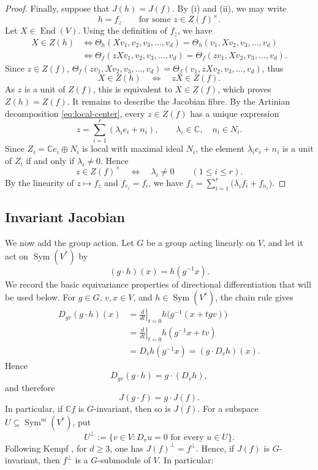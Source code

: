 \documentclass[11pt,reqno]{amsart}
\numberwithin{equation}{section}
\theoremstyle{definition}
\theoremstyle{remark}
\newcommand{\C}{\mathbb C}
\newcommand{\Sym}{\operatorname{Sym}}
\newcommand{\End}{\operatorname{End}}
\begin{document}
\begin{proof}
Finally, suppose that $J(h)=J(f)$.  By (i) and (ii), we may write
\[
  h=f_z
  \qquad\text{for some }z\in Z(f)^\times.
\]
Let $X\in\End(V)$.  Using the definition of $f_z$, we have
\[
\begin{aligned}
  X\in Z(h)
  &\Longleftrightarrow
  \Theta_h(Xv_1,v_2,v_3,\ldots,v_d)
  =
  \Theta_h(v_1,Xv_2,v_3,\ldots,v_d)
  \\
  &\Longleftrightarrow
  \Theta_f(zXv_1,v_2,v_3,\ldots,v_d)
  =
  \Theta_f(zv_1,Xv_2,v_3,\ldots,v_d).
\end{aligned}
\]
Since $z\in Z(f)$, $\Theta_f(zv_1,Xv_2,v_3,\ldots,v_d)
  =
  \Theta_f(v_1,zXv_2,v_3,\ldots,v_d)$, thus
  \[X\in Z(h)
  \quad\Longleftrightarrow\quad
  zX\in Z(f).
\]
As $z$ is a unit of $Z(f)$, this is equivalent to $X\in Z(f)$, which proves $Z(h)=Z(f)$. It remains to describe the Jacobian fibre.  By the Artinian decomposition
\eqref{eq:local-center}, every $z\in Z(f)$ has a unique expression
\[
  z=\sum_{i=1}^r(\lambda_i e_i+n_i),
  \qquad
  \lambda_i\in\C,\quad n_i\in N_i.
\]
Since $Z_i=\C e_i\oplus N_i$ is local with maximal ideal $N_i$, the
element $\lambda_i e_i+n_i$ is a unit of $Z_i$ if and only if
$\lambda_i\ne0$.  Hence
\[
  z\in Z(f)^\times
  \quad\Longleftrightarrow\quad
  \lambda_i\ne0\qquad(1\leq i\leq r).
\]
By the linearity of $z\mapsto f_z$ and
$f_{e_i}=f_i$, we have $f_z
  =
  \sum_{i=1}^r
  \bigl(\lambda_i f_i+f_{n_i}\bigr)$.
\end{proof}



\subsection{Invariant Jacobian}

We now add the group action. Let $G$ be a group acting linearly on $V$, and let it act on
$\Sym(V^*)$ by
\[
  (g\cdot h)(x)=h(g^{-1}x).
\]
We record the basic equivariance properties of directional
differentiation that will be used below. For $g\in G$, $v,x\in V$, and $h\in\Sym(V^*)$, the chain rule gives
\[
\begin{aligned}
  D_{gv}(g\cdot h)(x)
  &=
  \left.\frac{d}{dt}\right|_{t=0}
  h\bigl(g^{-1}(x+tgv)\bigr) \\
  &=
  \left.\frac{d}{dt}\right|_{t=0}
  h(g^{-1}x+tv) \\
  &=
  D_vh(g^{-1}x)
  =
  (g\cdot D_vh)(x).
\end{aligned}
\]
Hence
\begin{equation}\label{eq:directional-covariance}
  D_{gv}(g\cdot h)=g\cdot(D_vh),
\end{equation}
and therefore
\begin{equation}\label{eq:J-covariance}
  J(g\cdot f)=g\cdot J(f).
\end{equation}
In particular, if $\C f$ is $G$-invariant, then so is $J(f)$. For a subspace
$U\subseteq\Sym^m(V^*)$, put
\[
  U^\perp
  :=
  \{v\in V:D_vu=0\text{ for every }u\in U\}.
\]
Following Kempf \cite[Lemma~2 and Corollary~3]{Kempf}, for $d\geq3$,  one has $J(f)^\perp=f^\perp$. Hence, if $J(f)$ is $G$-invariant, then $f^\perp$ is a
$G$-submodule of $V$.  In particular:
\end{document}
